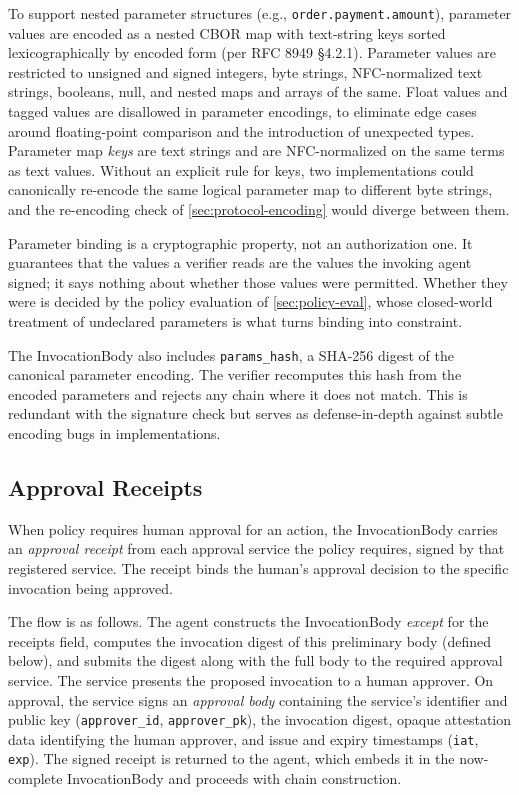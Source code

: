 \documentclass[11pt,a4paper]{article}
\begin{document}
To support nested parameter structures (e.g.,
\texttt{order.payment.amount}), parameter values are encoded as a
nested CBOR map with text-string keys sorted lexicographically by
encoded form (per RFC 8949 §4.2.1). Parameter values are restricted to
unsigned and signed integers, byte strings, NFC-normalized text
strings, booleans, null, and nested maps and arrays of the same. Float
values and tagged values are disallowed in parameter encodings, to
eliminate edge cases around floating-point comparison and the
introduction of unexpected types. Parameter map \emph{keys} are
text strings and are NFC-normalized on the same terms as text values.
Without an explicit rule for keys, two implementations could
canonically re-encode the same logical parameter map to different byte
strings, and the re-encoding check of \cref{sec:protocol-encoding}
would diverge between them.

Parameter binding is a cryptographic property, not an authorization
one. It guarantees that the values a verifier reads are the values the
invoking agent signed; it says nothing about whether those values were
permitted. Whether they were is decided by the policy evaluation of
\cref{sec:policy-eval}, whose closed-world treatment of undeclared
parameters is what turns binding into constraint.

The InvocationBody also includes \texttt{params\_hash}, a SHA-256
digest of the canonical parameter encoding. The verifier recomputes
this hash from the encoded parameters and rejects any chain where it
does not match. This is redundant with the signature check but serves
as defense-in-depth against subtle encoding bugs in implementations.

\subsection{Approval Receipts}
\label{sec:protocol-approvals}

When policy requires human approval for an action, the InvocationBody
carries an \emph{approval receipt} from each approval service the
policy requires, signed by that registered service. The receipt binds the human's approval decision to the
specific invocation being approved.

The flow is as follows. The agent constructs the InvocationBody
\emph{except} for the receipts field, computes the invocation digest of
this preliminary body (defined below), and submits the digest along with the full body
to the required approval service. The service presents the proposed
invocation to a human approver. On approval, the service signs an
\emph{approval body} containing the service's identifier
and public key (\texttt{approver\_id}, \texttt{approver\_pk}), the
invocation digest, opaque
attestation data identifying the human approver, and issue and expiry
timestamps (\texttt{iat}, \texttt{exp}). The signed receipt is returned to the
agent, which embeds it in the now-complete InvocationBody and proceeds
with chain construction.
\end{document}
